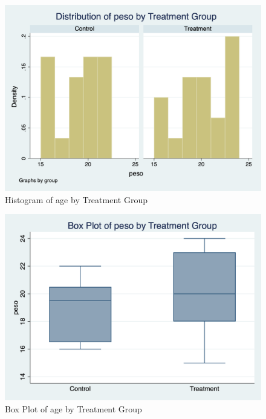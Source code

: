 \documentclass{article}
\begin{document}
\begin{figure}[h]
\centering
\includegraphics[scale=0.30]{histogram_peso_ntrad.png}
\caption{Histogram of age by Treatment Group}
\end{figure}

\begin{figure}[h]
\centering
\includegraphics[scale=0.30]{box_plot_peso_ntrad.png}
\caption{Box Plot of age by Treatment Group}
\end{figure}
\end{document}
